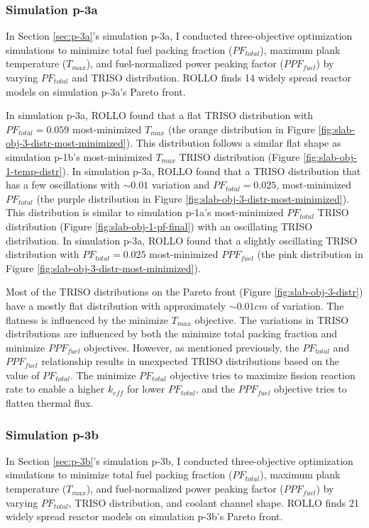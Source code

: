 \subsubsection{Simulation p-3a}
In Section \ref{sec:p-3a}'s simulation p-3a, I conducted three-objective 
optimization simulations to minimize total fuel packing fraction ($PF_{total}$), 
maximum plank temperature ($T_{max}$), and fuel-normalized power peaking factor 
($PPF_{fuel}$) by varying $PF_{total}$ and TRISO distribution.
\gls{ROLLO} finds 14 widely spread reactor models on simulation p-3a's Pareto 
front. 

In simulation p-3a, \gls{ROLLO} found that a flat TRISO distribution with 
$PF_{total} = 0.059$ most-minimized $T_{max}$
(the orange distribution in Figure \ref{fig:slab-obj-3-distr-most-minimized}). 
This distribution follows a similar flat shape as simulation p-1b's most-minimized 
$T_{max}$ TRISO distribution (Figure \ref{fig:slab-obj-1-temp-distr}).
In simulation p-3a, \gls{ROLLO} found that a TRISO distribution that has a few 
oscillations with $\sim0.01$ variation and $PF_{total} = 0.025$, 
most-minimized $PF_{total}$
(the purple distribution in Figure \ref{fig:slab-obj-3-distr-most-minimized}). 
This distribution is similar to simulation p-1a's most-minimized $PF_{total}$ TRISO 
distribution (Figure \ref{fig:slab-obj-1-pf-final}) with an oscillating TRISO 
distribution.
In simulation p-3a, \gls{ROLLO} found that a slightly oscillating TRISO distribution with
$PF_{total} = 0.025$ most-minimized $PPF_{fuel}$
(the pink distribution in Figure \ref{fig:slab-obj-3-distr-most-minimized}). 

Most of the \gls{TRISO} distributions on the Pareto front (Figure 
\ref{fig:slab-obj-3-distr}) have a mostly flat distribution with approximately 
$\sim0.01cm$ of variation. 
The flatness is influenced by the minimize $T_{max}$ objective. 
The variations in \gls{TRISO} distributions are influenced by both the minimize 
total packing fraction and minimize $PPF_{fuel}$ objectives. 
However, as mentioned previously, the $PF_{total}$ and $PPF_{fuel}$ relationship
results in unexpected TRISO distributions based on the value of $PF_{total}$. 
The minimize $PF_{total}$ objective tries to maximize fission reaction rate
to enable a higher $k_{eff}$ for lower $PF_{total}$, and 
the $PPF_{fuel}$ objective tries to flatten thermal flux. 

\subsubsection{Simulation p-3b}
In Section \ref{sec:p-3b}'s simulation p-3b, I conducted three-objective 
optimization simulations to minimize total fuel packing fraction ($PF_{total}$), 
maximum plank temperature ($T_{max}$), and fuel-normalized power peaking factor 
($PPF_{fuel}$) by varying $PF_{total}$, TRISO distribution, and coolant channel shape.
\gls{ROLLO} finds 21 widely spread reactor models on simulation p-3b's Pareto 
front. 

